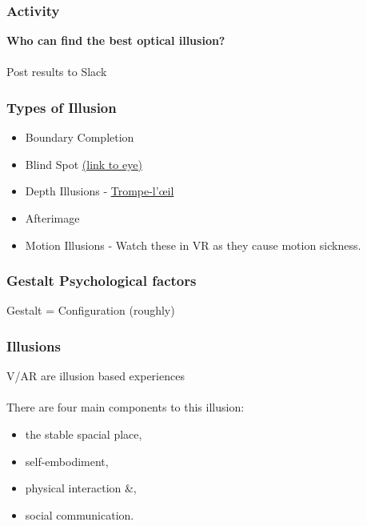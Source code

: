 \begin{frame}
	\frametitle{Activity}
	\textbf{Who can find the best optical illusion?} \\~\\
	
	Post results to Slack
	
\end{frame}

\begin{frame}
	\frametitle{Types of Illusion}
	\begin{itemize}
		\item Boundary Completion
		\item Blind Spot \href{http://snowbrains.com/wp-content/uploads/2013/07/eyeball.jpg}{ (link to eye)}
		\item Depth Illusions - \href{https://www.youtube.com/watch?v=QmMTwjUdqbg}{Trompe-l'\oe il}
		\item Afterimage
		\item Motion Illusions - Watch these in VR as they cause motion sickness. 
	\end{itemize}
\end{frame}

\begin{frame}
	\frametitle{Gestalt Psychological factors}
	Gestalt = Configuration (roughly)
\end{frame}

\begin{frame}
	\frametitle{Illusions}
	V/AR are illusion based experiences \\~\\ 
	
	There are four main components to this illusion:
	\begin{itemize}
		\item the stable spacial place,
		\item self-embodiment,
		\item physical interaction \&,
		\item social communication.
	\end{itemize}
\end{frame}


